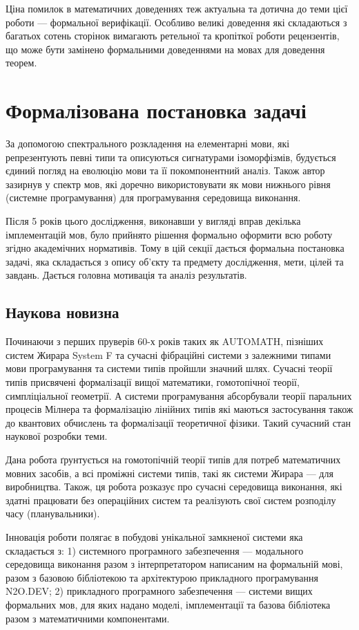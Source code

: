 Ціна помилок в математичних доведеннях теж актуальна та дотична до теми цієї роботи ---
формальної верифікації. Особливо великі доведення які складаються з багатьох сотень
 сторінок вимагають ретельної та кропіткої роботи рецензентів, що може бути замінено
формальними доведеннями на мовах для доведення теорем.

\section{Формалізована постановка задачі}
За допомогою спектрального розкладення на елементарні мови, які репрезентують
певні типи та описуються сигнатурами ізоморфізмів, будується єдиний погляд на
еволюцію мови та її покомпонентний аналіз. Також автор зазирнув у спектр мов,
які доречно використовувати як мови нижнього рівня (системне програмування)
для програмування середовища виконання.

Після 5 років цього дослідження, виконавши у вигляді вправ декілька імплементацій мов,
було прийнято рішення формально оформити всю роботу згідно академічних нормативів.
Тому в цій секції дається формальна постановка задачі, яка складається з опису
об'єкту та предмету дослідження, мети, цілей та завдань.
Дається головна мотивація та аналіз результатів.

\subsection{Наукова новизна}
Починаючи з перших пруверів 60-х років таких як AUTOMATH, пізніших систем Жирара
System F та сучасні фібраційні системи з залежними типами мови програмування та
системи типів пройшли значний шлях. Сучасні теорії типів присвячені формалізації
вищої математики, гомотопічної теорії, симпліціальної геометрії. А системи
програмування абсорбували теорії паральних процесів Мілнера та формалізацію
лінійних типів які маються застосування також до квантових обчислень та формалізації
теоретичної фізики. Такий сучасний стан наукової розробки теми.

Дана робота ґрунтується на гомотопічній теорії типів для потреб математичних
мовних засобів, а всі проміжні системи типів, такі як системи Жирара --- для
виробництва. Також, ця робота розказує про сучасні середовища виконання, які
здатні працювати без операційних систем та реалізують свої систем розподілу часу (планувальники).

Інновація роботи полягає в побудові унікальної замкненої системи яка складається з:
1) системного програмного забезпечення --- модального середовища
виконання разом з інтерпретатором написаним на формальній мові, разом з
базовою бібліотекою та архітектурою прикладного програмування N2O.DEV;
2) прикладного програмного забезпечення --- системи вищих формальних мов,
для яких надано моделі, імплементації та базова бібліотека разом з математичними
компонентами.

